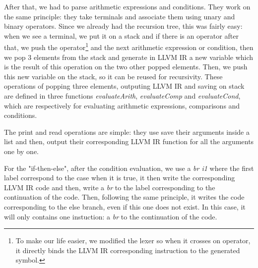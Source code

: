 \documentclass{article}
\begin{document}
After that, we had to parse arithmetic expressions and conditions. They work on the same principle: they take terminals and associate them using unary and binary operators. Since we already had the recursion tree, this was fairly easy: when we see a terminal, we put it on a stack and if there is an operator after that, we push the operator\footnote{To make our life easier, we modified the lexer so when it crosses on operator, it directly binds the LLVM IR corresponding instruction to the generated symbol.} and the next arithmetic expression or condition, then we pop 3 elements from the stack and generate in LLVM IR a new variable which is the result of this operation on the two other popped elements. Then, we push this new variable on the stack, so it can be reused for recursivity. These operations of popping three elements, outputing LLVM IR and saving on stack are defined in three functions \textit{evaluateArith}, \textit{evaluateComp} and \textit{evaluateCond}, which are respectively for evaluating arithmetic expressions, comparisons and conditions.

The print and read operations are simple: they use save their arguments inside a list and then, output their corresponding LLVM IR function for all the arguments one by one.

For the "if-then-else", after the condition evaluation, we use a \textit{br i1} where the first label correspond to the case when it is true, it then write the corresponding LLVM IR code and then, write a \textit{br} to the label corresponding to the continuation of the code. Then, following the same principle, it writes the code corresponding to the else branch, even if this one does not exist. In this case, it will only contains one instuction: a \textit{br} to the continuation of the code.
\end{document}
